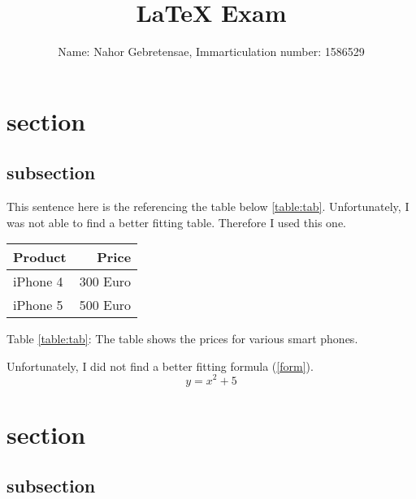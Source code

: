 \documentclass{article}
\begin{document}
\title{LaTeX Exam} 
\author{Name: Nahor Gebretensae, Immarticulation number: 1586529}
\maketitle

\newpage
\tableofcontents

\newpage
\listoftables
{}

\newpage

\section{section}
\subsection{subsection}


This sentence here is the referencing the table below \ref{table:tab}. 
\newline
Unfortunately, I was not able to find a better fitting table. Therefore I used this one.

\begin{center}
	\begin{table}
	\label{table:tab}
	\end{table}
	\begin{tabular}{|l|r|} 
		\hline 
		Product & Price\\ \hline 
		iPhone 4 & 300 Euro\\ \hline 
		iPhone 5 & 500 Euro\\ \hline 
	\end{tabular}
\end{center}
Table \ref{table:tab}: The table shows the prices for various smart phones.

\newpage

Unfortunately, I did not find a better fitting formula (\ref{form}).
\begin{equation}
	y = x^2 + 5 \label{form}
\end{equation}

\newpage
\section{section}
\subsection{subsection}
\end{document}
